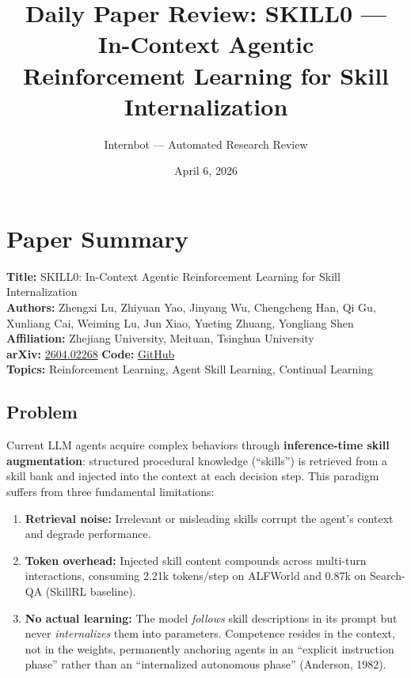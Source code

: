 \documentclass[11pt]{article}
\title{Daily Paper Review: SKILL0 --- In-Context Agentic\\Reinforcement Learning for Skill Internalization}
\author{Internbot --- Automated Research Review}
\date{April 6, 2026}
\begin{document}
\maketitle

\section{Paper Summary}

\textbf{Title:} SKILL0: In-Context Agentic Reinforcement Learning for Skill Internalization \\
\textbf{Authors:} Zhengxi Lu, Zhiyuan Yao, Jinyang Wu, Chengcheng Han, Qi Gu, Xunliang Cai, Weiming Lu, Jun Xiao, Yueting Zhuang, Yongliang Shen \\
\textbf{Affiliation:} Zhejiang University, Meituan, Tsinghua University \\
\textbf{arXiv:} \href{https://arxiv.org/abs/2604.02268}{2604.02268} \quad \textbf{Code:} \href{https://github.com/ZJU-REAL/SkillZero}{GitHub} \\
\textbf{Topics:} Reinforcement Learning, Agent Skill Learning, Continual Learning

\subsection{Problem}

Current LLM agents acquire complex behaviors through \textbf{inference-time skill augmentation}: structured procedural knowledge (``skills'') is retrieved from a skill bank and injected into the context at each decision step. This paradigm suffers from three fundamental limitations:

\begin{enumerate}
    \item \textbf{Retrieval noise:} Irrelevant or misleading skills corrupt the agent's context and degrade performance.
    \item \textbf{Token overhead:} Injected skill content compounds across multi-turn interactions, consuming 2.21k tokens/step on ALFWorld and 0.87k on Search-QA (SkillRL baseline).
    \item \textbf{No actual learning:} The model \emph{follows} skill descriptions in its prompt but never \emph{internalizes} them into parameters. Competence resides in the context, not in the weights, permanently anchoring agents in an ``explicit instruction phase'' rather than an ``internalized autonomous phase'' (Anderson, 1982).
\end{enumerate}
\end{document}
